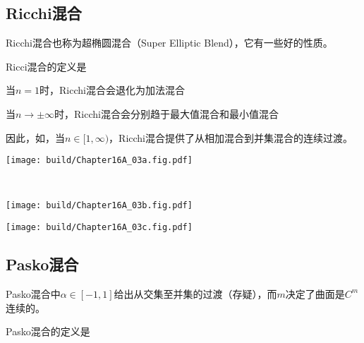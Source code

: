 \subsection{Ricchi混合}
Ricchi混合也称为超椭圆混合（Super Elliptic Blend），它有一些好的性质。
\begin{BoxFormula}[Ricci混合]
    Ricci混合的定义是
\end{BoxFormula}


当$n=1$时，Ricchi混合会退化为加法混合
当$n\to\pm\infty$时，Ricchi混合会分别趋于最大值混合和最小值混合

因此，如，当$n\in[1,\infty)$，Ricchi混合提供了从相加混合到并集混合的连续过渡。
\begin{Figure}[Ricci混合]
    \begin{FigureSub}[$n=1$;Ricci n=1]
        \texttt{[image: build/Chapter16A\_03a.fig.pdf]}
    \end{FigureSub}\\ \vspace{0.25cm}
    \begin{FigureSub}[$n=2$;Ricci n=2]
        \texttt{[image: build/Chapter16A\_03b.fig.pdf]}
    \end{FigureSub}\hspace{1cm}
    \begin{FigureSub}[$n=4$;Ricci n=4]
        \texttt{[image: build/Chapter16A\_03c.fig.pdf]}
    \end{FigureSub}
\end{Figure}

\subsection{Pasko混合}
Pasko混合中$\alpha\in[-1,1]$给出从交集至并集的过渡（存疑），而$m$决定了曲面是$C^m$连续的。
\begin{BoxFormula}[Pasko混合]
    Pasko混合的定义是
\end{BoxFormula}

